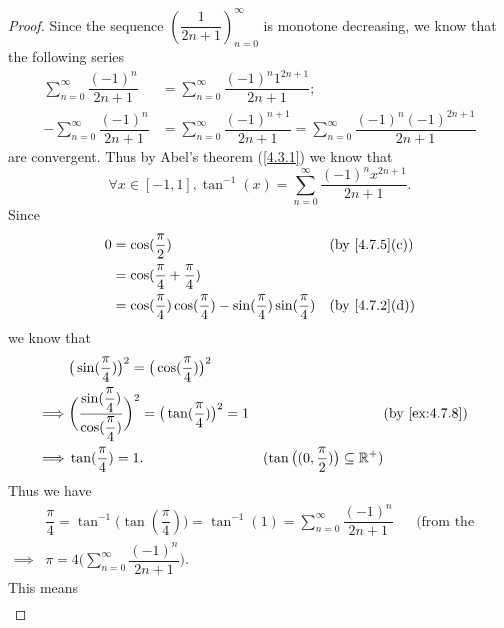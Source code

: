 \begin{proof}
  Since the sequence \((\dfrac{1}{2n + 1})_{n = 0}^\infty\) is monotone decreasing, we know that the following series
  \begin{align*}
    \sum_{n = 0}^\infty \dfrac{(-1)^n}{2n + 1}  & = \sum_{n = 0}^\infty \dfrac{(-1)^n 1^{2n + 1}}{2n + 1};                                                      \\
    -\sum_{n = 0}^\infty \dfrac{(-1)^n}{2n + 1} & = \sum_{n = 0}^\infty \dfrac{(-1)^{n + 1}}{2n + 1} = \sum_{n = 0}^\infty \dfrac{(-1)^n (-1)^{2n + 1}}{2n + 1}
  \end{align*}
  are convergent.
  Thus by Abel's theorem (\cref{4.3.1}) we know that
  \[
    \forall x \in [-1, 1], \tan^{-1}(x) = \sum_{n = 0}^\infty \dfrac{(-1)^n x^{2n + 1}}{2n + 1}.
  \]
  Since
  \begin{align*}
    0 & = \cos(\dfrac{\pi}{2})                                                                  &  & \text{(by \cref{4.7.5}(c))} \\
      & = \cos(\dfrac{\pi}{4} + \dfrac{\pi}{4})                                                                                  \\
      & = \cos(\dfrac{\pi}{4}) \cos(\dfrac{\pi}{4}) - \sin(\dfrac{\pi}{4}) \sin(\dfrac{\pi}{4}) &  & \text{(by \cref{4.7.2}(d))}
  \end{align*}
  we know that
  \begin{align*}
             & \big(\sin(\dfrac{\pi}{4})\big)^2 = \big(\cos(\dfrac{\pi}{4})\big)^2                                                                                                          \\
    \implies & \bigg(\dfrac{\sin(\dfrac{\pi}{4})}{\cos(\dfrac{\pi}{4})}\bigg)^2 = \big(\tan(\dfrac{\pi}{4})\big)^2 = 1 &                                                    & \by{ex:4.7.8} \\
    \implies & \tan(\dfrac{\pi}{4}) = 1.                                                                               & (\tan\big((0, \dfrac{\pi}{2})\big) \subseteq \R^+)
  \end{align*}
  Thus we have
  \begin{align*}
             & \dfrac{\pi}{4} = \tan^{-1}\big(\tan(\dfrac{\pi}{4})\big) = \tan^{-1}(1) = \sum_{n = 0}^\infty \dfrac{(-1)^n}{2n + 1} &  & \text{(from the proof above)} \\
    \implies & \pi = 4 \bigg(\sum_{n = 0}^\infty \dfrac{(-1)^n}{2n + 1}\bigg).
  \end{align*}
  This means
  \begin{align*}

\end{align*}
\end{proof}

